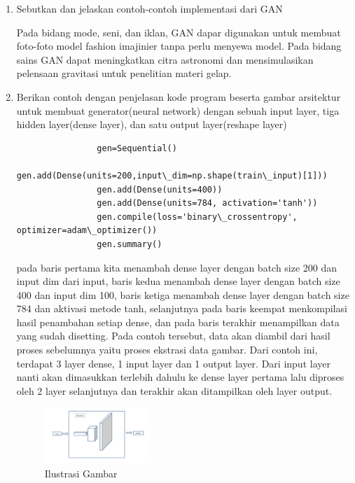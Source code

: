 \begin{enumerate}
            \item Sebutkan dan jelaskan contoh-contoh implementasi dari GAN
            \par Pada bidang mode, seni, dan iklan, GAN dapar digunakan untuk membuat foto-foto model fashion imajinier tanpa perlu menyewa model. Pada bidang sains GAN dapat meningkatkan citra astronomi dan mensimulasikan pelensaan gravitasi untuk penelitian materi gelap.

            \item Berikan contoh dengan penjelasan kode program beserta gambar arsitektur untuk membuat generator(neural network) dengan sebuah input layer, tiga hidden layer(dense layer), dan satu output layer(reshape layer)
                \begin{verbatim}
                gen=Sequential() 
                gen.add(Dense(units=200,input\_dim=np.shape(train\_input)[1])) 
                gen.add(Dense(units=400))
                gen.add(Dense(units=784, activation='tanh')) 
                gen.compile(loss='binary\_crossentropy', optimizer=adam\_optimizer()) 
                gen.summary() 
                \end{verbatim}    
            \par pada baris pertama kita menambah dense layer dengan batch size 200 dan input dim dari input, baris kedua menambah dense layer dengan batch size 400 dan input dim 100, baris ketiga menambah dense layer dengan batch size 784 dan aktivasi metode tanh, selanjutnya pada baris keempat menkompilasi hasil penambahan setiap dense, dan pada baris terakhir menampilkan data yang sudah disetting. Pada contoh tersebut, data akan diambil dari hasil proses sebelumnya yaitu proses ekstrasi data gambar. Dari contoh ini, terdapat 3 layer dense, 1 input layer dan 1 output layer. Dari input layer nanti akan dimasukkan terlebih dahulu ke dense layer pertama lalu diproses oleh 2 layer selanjutnya dan terakhir akan ditampilkan oleh layer output.
            \begin{figure}[H]
                \includegraphics[width=4cm]{figures/1174057/chapter8/teori9.png}
                \centering
                \caption{Ilustrasi Gambar}
            \end{figure}


\end{enumerate}
